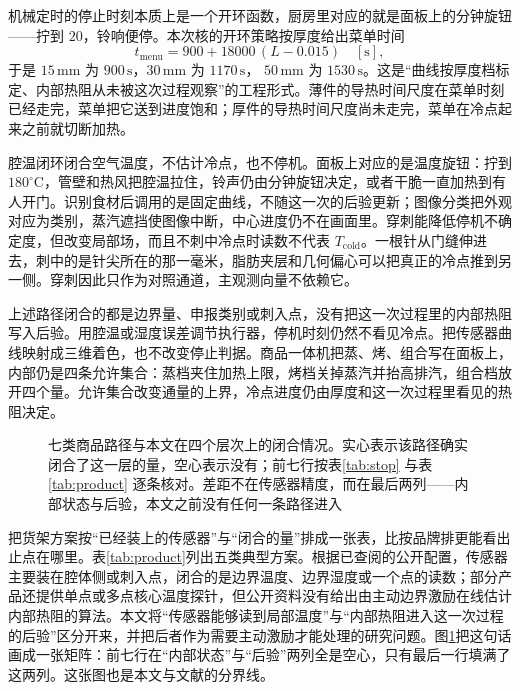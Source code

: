 机械定时的停止时刻本质上是一个开环函数，厨房里对应的就是面板上的分钟旋钮——拧到 \(20\)，铃响便停。本次核的开环策略按厚度给出菜单时间
\begin{equation}
\label{eq:menu}
t_{\mathrm{menu}}=900+18000\,(L-0.015)\quad[\mathrm{s}],
\end{equation}
于是 \(15\,\mathrm{mm}\) 为 \(900\,\mathrm{s}\)，\(30\,\mathrm{mm}\) 为 \(1170\,\mathrm{s}\)，
\(50\,\mathrm{mm}\) 为 \(1530\,\mathrm{s}\)。这是“曲线按厚度档标定、内部热阻从未被这次过程观察”的工程形式。薄件的导热时间尺度在菜单时刻已经走完，菜单把它送到进度饱和；厚件的导热时间尺度尚未走完，菜单在冷点起来之前就切断加热。

腔温闭环闭合空气温度，不估计冷点，也不停机。面板上对应的是温度旋钮：拧到 \(180^\circ\mathrm{C}\)，管壁和热风把腔温拉住，铃声仍由分钟旋钮决定，或者干脆一直加热到有人开门。识别食材后调用的是固定曲线，不随这一次的后验更新；图像分类把外观对应为类别，蒸汽遮挡使图像中断，中心进度仍不在画面里。穿刺能降低停机不确定度，但改变局部场，而且不刺中冷点时读数不代表 \(T_{\mathrm{cold}}\)。一根针从门缝伸进去，刺中的是针尖所在的那一毫米，脂肪夹层和几何偏心可以把真正的冷点推到另一侧。穿刺因此只作为对照通道，主观测向量不依赖它。

上述路径闭合的都是边界量、申报类别或刺入点，没有把这一次过程里的内部热阻写入后验。用腔温或湿度误差调节执行器，停机时刻仍然不看见冷点。把传感器曲线映射成三维着色，也不改变停止判据。商品一体机把蒸、烤、组合写在面板上，内部仍是四条允许集合：蒸档夹住加热上限，烤档关掉蒸汽并抬高排汽，组合档放开四个量。允许集合改变通量的上界，冷点进度仍由厚度和这一次过程里看见的热阻决定。

\begin{figure}[t]
\centering
{}
\caption{七类商品路径与本文在四个层次上的闭合情况。实心表示该路径确实闭合了这一层的量，空心表示没有；前七行按表\ref{tab:stop} 与表\ref{tab:product} 逐条核对。差距不在传感器精度，而在最后两列——内部状态与后验，本文之前没有任何一条路径进入}
\label{fig:stopmap}
\end{figure}

把货架方案按“已经装上的传感器”与“闭合的量”排成一张表，比按品牌排更能看出止点在哪里。表\ref{tab:product}{}列出五类典型方案。根据已查阅的公开配置，传感器主要装在腔体侧或刺入点，闭合的是边界温度、边界湿度或一个点的读数；部分产品还提供单点或多点核心温度探针，但公开资料没有给出由主动边界激励在线估计内部热阻的算法。本文将“传感器能够读到局部温度”与“内部热阻进入这一次过程的后验”区分开来，并把后者作为需要主动激励才能处理的研究问题。图\ref{fig:stopmap}{}把这句话画成一张矩阵：前七行在“内部状态”与“后验”两列全是空心，只有最后一行填满了这两列。这张图也是本文与文献的分界线。

